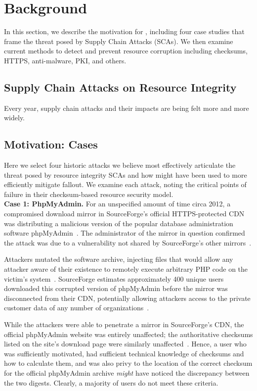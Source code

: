 \section{Background} \label{sec:background}

In this section, we describe the motivation for \SYSTEM{}, including four case
studies that frame the threat posed by Supply Chain Attacks (SCAs). We then
examine current methods to detect and prevent resource corruption including
checksums, HTTPS, anti-malware, PKI, and others.

\subsection{Supply Chain Attacks on Resource Integrity}

Every year, supply chain attacks and their impacts are being felt more and more
widely. 

\subsection{Motivation: Cases}

Here we select four historic attacks we believe most effectively articulate the
threat posed by resource integrity SCAs and how \SYSTEM{} might have been used
to more efficiently mitigate fallout. We examine each attack, noting the
critical points of failure in their checksum-based resource security model. \\

\noindent\textbf{Case 1: PhpMyAdmin.} For an unspecified amount of time circa
2012, a compromised download mirror in SourceForge's official HTTPS-protected
CDN was distributing a malicious version of the popular database administration
software phpMyAdmin~\cite{SCA-PMA3}. The administrator of the mirror in question
confirmed the attack was due to a vulnerability not shared by SourceForge's
other mirrors~\cite{SCA-PMA2}.

Attackers mutated the software archive, injecting files that would allow any
attacker aware of their existence to remotely execute arbitrary PHP code on the
victim's system~\cite{SCA-PMA1}. SourceForge estimates approximately 400 unique
users downloaded this corrupted version of phpMyAdmin before the mirror was
disconnected from their CDN, potentially allowing attackers access to the
private customer data of any number of organizations~\cite{SCA-PMA2}.

While the attackers were able to penetrate a mirror in SourceForge's CDN, the
official phpMyAdmin website was entirely unaffected; the authoritative checksums
listed on the site's download page were similarly unaffected~\cite{SCA-PMA2}.
Hence, a user who was sufficiently motivated, had sufficient technical knowledge
of checksums and how to calculate them, and was also privy to the location of
the correct checksum for the official phpMyAdmin archive \emph{might} have
noticed the discrepancy between the two digests. Clearly, a majority of users do
not meet these criteria. \\

